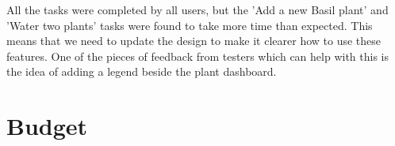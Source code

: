 \documentclass{article}
\begin{document}
All the tasks were completed by all users, but the 'Add a new Basil plant' and 'Water two plants' tasks were found to take more time than expected. This means that we need to update the design to make it clearer how to use these features. One of the pieces of feedback from testers which can help with this is the idea of adding a legend beside the plant dashboard.


\section{Budget}\label{budget_account}

\begin{table}[h]
    \centering
{\scriptsize
\begin{tabular}{ |p{2.8cm}|p{1.6cm}|p{1cm}|p{0.9cm}|  }

\hline



\end{tabular}}
\end{table}
\end{document}
